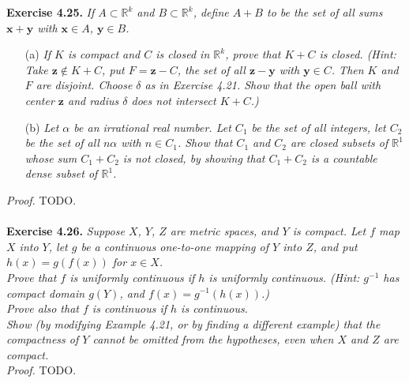 \documentclass{article}
\begin{document}



\textbf{Exercise 4.25.}
\emph{If $A \subset \mathbb{R}^k$ and $B \subset \mathbb{R}^k$,
define $A+B$ to be the set of all sums $\mathbf{x}+\mathbf{y}$ with
$\mathbf{x} \in A$, $\mathbf{y} \in B$.}

\begin{enumerate}
\item[(a)]
\emph{If $K$ is compact and $C$ is closed in $\mathbb{R}^k$,
prove that $K+C$ is closed.
(Hint: Take $\mathbf{z} \notin K+C$,
put $F = \mathbf{z}-C$,
the set of all $\mathbf{z}-\mathbf{y}$ with $\mathbf{y} \in C$.
Then $K$ and $F$ are disjoint.
Choose $\delta$ as in Exercise 4.21.
Show that the open ball with center $\mathbf{z}$ and radius $\delta$ does not intersect $K+C$.)}
\item[(b)]
\emph{Let $\alpha$ be an irrational real number.
Let $C_1$ be the set of all integers,
let $C_2$ be the set of all $n \alpha$ with $n \in C_1$.
Show that $C_1$ and $C_2$ are closed subsets of $\mathbb{R}^1$
whose sum $C_1 + C_2$ is not closed,
by showing that $C_1 + C_2$ is a countable dense subset of $\mathbb{R}^1$.} \\
\end{enumerate}

\emph{Proof.}
TODO. \\\\






\textbf{Exercise 4.26.}
\emph{Suppose $X$, $Y$, $Z$ are metric spaces, and $Y$ is compact.
Let $f$ map $X$ into $Y$,
let $g$ be a continuous one-to-one mapping of $Y$ into $Z$,
and put $h(x) = g(f(x))$ for $x \in X$.} \\

\emph{Prove that $f$ is uniformly continuous if $h$ is uniformly continuous.
(Hint: $g^{-1}$ has compact domain $g(Y)$, and $f(x) = g^{-1}(h(x))$.)} \\

\emph{Prove also that $f$ is continuous if $h$ is continuous. } \\

\emph{Show (by modifying Example 4.21, or by finding a different example) that
the compactness of $Y$ cannot be omitted from the hypotheses,
even when $X$ and $Z$ are compact.} \\

\emph{Proof.}
TODO. \\\\
\end{document}
